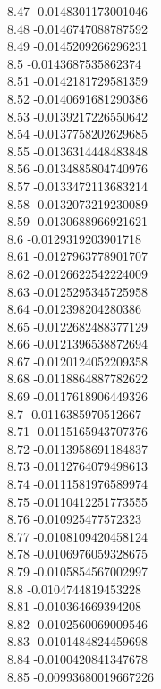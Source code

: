 {8.47	-0.0148301173001046\\
8.48	-0.0146747088787592\\
8.49	-0.0145209266296231\\
8.5	-0.0143687535862374\\
8.51	-0.0142181729581359\\
8.52	-0.0140691681290386\\
8.53	-0.0139217226550642\\
8.54	-0.0137758202629685\\
8.55	-0.0136314448483848\\
8.56	-0.0134885804740976\\
8.57	-0.0133472113683214\\
8.58	-0.0132073219230089\\
8.59	-0.0130688966921621\\
8.6	-0.0129319203901718\\
8.61	-0.0127963778901707\\
8.62	-0.0126622542224009\\
8.63	-0.0125295345725958\\
8.64	-0.012398204280386\\
8.65	-0.0122682488377129\\
8.66	-0.0121396538872694\\
8.67	-0.0120124052209358\\
8.68	-0.0118864887782622\\
8.69	-0.0117618906449326\\
8.7	-0.0116385970512667\\
8.71	-0.0115165943707376\\
8.72	-0.0113958691184837\\
8.73	-0.0112764079498613\\
8.74	-0.0111581976589974\\
8.75	-0.0110412251773555\\
8.76	-0.010925477572323\\
8.77	-0.0108109420458124\\
8.78	-0.0106976059328675\\
8.79	-0.0105854567002997\\
8.8	-0.0104744819453228\\
8.81	-0.010364669394208\\
8.82	-0.0102560069009546\\
8.83	-0.0101484824459698\\
8.84	-0.0100420841347678\\
8.85	-0.00993680019667226\\
}
